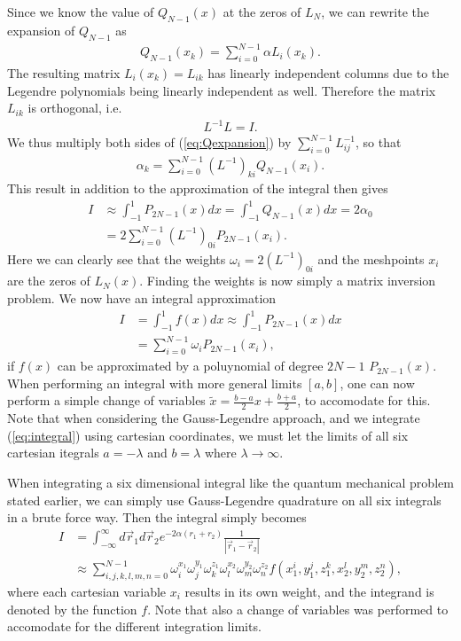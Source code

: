 \documentclass[twocolumn]{aastex62}
\begin{document}
Since we know the value of $Q_{N-1}(x)$ at the zeros of $L_N$, we can rewrite the expansion of $Q_{N-1}$ as
\begin{align}
	Q_{N-1} (x_k)= \sum^{N-1}_{i=0} \alpha L_i(x_k).
	\label{eq:Qexpansion}
\end{align}
The resulting matrix $L_i(x_k) = L_{ik}$ has linearly independent columns due to the Legendre polynomials being linearly independent as well. Therefore the matrix $L_{ik}$ is orthogonal, i.e.
\begin{align}
	L^{-1}L = I.
\end{align}
We thus multiply both sides of (\ref{eq:Qexpansion}) by $\sum^{N-1}_{i=0}L^{-1}_{ij}$, so that 
\begin{align}
	\alpha_k = \sum_{i=0}^{N-1} (L^{-1})_{ki}Q_{N-1}(x_i).
\end{align}
This result in addition to the approximation of the integral then gives
\begin{align}
	I &\approx \int^1_{-1} P_{2N-1}(x)dx = \int^1_{-1} Q_{N-1}(x)dx = 2\alpha_0 \\
	&= 2 \sum^{N-1}_{i=0} (L^{-1})_{0i}P_{2N-1}(x_i).
\end{align}
Here we can clearly see that the weights $\omega_i = 2(L^{-1})_{0i}$ and the meshpoints $x_i$ are the zeros of $L_N(x)$. Finding the weights is now simply a matrix inversion problem.
We now have an integral approximation
\begin{align}
	I &= \int^1_{-1} f(x) dx \approx \int^1_{-1} P_{2N-1}(x)dx\\
	 &= \sum^{N-1}_{i=0}\omega_iP_{2N-1}(x_i), 
\end{align}
if $f(x)$ can be approximated by a poluynomial of degree $2N-1$ $P_{2N-1}(x)$. When performing an integral with more general limits $[a,b]$, one can now perform a simple change of variables $\tilde{x} = \frac{b - a}{2}x + \frac{b + a}{2}$, to accomodate for this. Note that when considering the Gauss-Legendre approach, and we integrate (\ref{eq:integral}) using cartesian coordinates, we must let the limits of all six cartesian itegrals $a = -\lambda$ and $b = \lambda$ where $\lambda\to\infty$.

When integrating a six dimensional integral like the quantum mechanical problem stated earlier, we can simply use Gauss-Legendre quadrature on all six integrals in a brute force way. Then the integral simply becomes 
\begin{align}
	I &= \int^\infty_{-\infty} d\vec{r}_1d\vec{r}_2 e^{-2\alpha(r_1 + r_2)}\frac{1}{|\vec{r}_1 - \vec{r}_2|} \\
	&\approx \sum_{i, j, k, l, m, n = 0}^{N-1} \omega^{x_1}_i \omega^{y_1}_j \omega^{z_1}_k \omega^{x_2}_l \omega^{y_2}_m \omega^{z_2}_n f(x_1^i, y_1^j, z_1^k, x_2^l, y_2^m, z_2^n),
\end{align} 
where each cartesian variable $x_i$ results in its own weight, and the integrand is denoted by the function $f$. Note that also a change of variables was performed to accomodate for the different integration limits.
\end{document}
